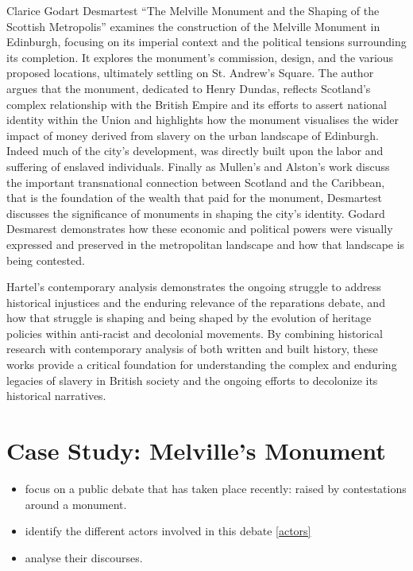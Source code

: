 \documentclass{scrartcl}
\begin{document}
Clarice Godart Desmartest “The Melville Monument and the Shaping of the Scottish Metropolis” examines the construction of the Melville Monument in Edinburgh, focusing on its imperial context and the political tensions surrounding its completion. It explores the monument's commission, design, and the various proposed locations, ultimately settling on St. Andrew's Square. The author argues that the monument, dedicated to Henry Dundas, reflects Scotland's complex relationship with the British Empire and its efforts to assert national identity within the Union and highlights how the monument visualises the wider impact of money derived from slavery on the urban landscape of Edinburgh. Indeed much of the city's development, was directly built upon the labor and suffering of enslaved individuals. Finally as Mullen’s and Alston’s work discuss the important transnational connection between Scotland and the Caribbean, that is the foundation of the wealth that paid for the monument, Desmartest discusses the significance of monuments in shaping the city's identity. Godard Desmarest demonstrates how these economic and political powers were visually expressed and preserved in the metropolitan landscape and how that landscape is being contested. 

Hartel's contemporary analysis demonstrates the ongoing struggle to address historical injustices and the enduring relevance of the reparations debate, and how that struggle is shaping and being shaped by the evolution of heritage policies within anti-racist and decolonial movements.
By combining historical research with contemporary analysis of both written and built history, these works provide a critical foundation for understanding the complex and enduring legacies of slavery in British society and the ongoing efforts to decolonize its historical narratives.

\section{Case Study: Melville's Monument}

\begin{itemize}
    \item focus on a public debate that has taken place recently: raised by contestations around a monument. 
    \item identify the different actors involved in this debate \ref{actors}
    \item analyse their discourses. 
\end{itemize}
\end{document}
